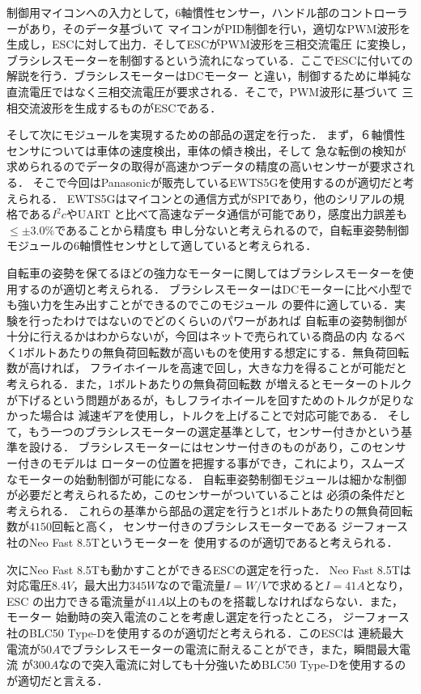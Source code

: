 \documentclass[uplatex,dvipdfmx]{jsarticle}
\begin{document}
制御用マイコンへの入力として，6軸慣性センサー，ハンドル部のコントローラーがあり，そのデータ基づいて
マイコンがPID制御を行い，適切なPWM波形を生成し，ESCに対して出力．そしてESCがPWM波形を三相交流電圧
に変換し，ブラシレスモーターを制御するという流れになっている．ここでESCに付いての解説を行う．ブラシレスモーターはDCモーター
と違い，制御するために単純な直流電圧ではなく三相交流電圧が要求される．そこで，PWM波形に基づいて
三相交流波形を生成するものがESCである．

そして次にモジュールを実現するための部品の選定を行った．
まず，６軸慣性センサについては車体の速度検出，車体の傾き検出，そして
急な転倒の検知が求められるのでデータの取得が高速かつデータの精度の高いセンサーが要求される．
そこで今回はPanasonicが販売しているEWTS5Gを使用するのが適切だと考えられる\cite{rokujiku}．
EWTS5Gはマイコンとの通信方式がSPIであり，他のシリアルの規格である$I^2c$やUART
と比べて高速なデータ通信が可能であり，感度出力誤差も$\leq \pm 3.0\%$であることから精度も
申し分ないと考えられるので，自転車姿勢制御モジュールの6軸慣性センサとして適していると考えられる．

自転車の姿勢を保てるほどの強力なモーターに関してはブラシレスモーターを使用するのが適切と考えられる．
ブラシレスモーターはDCモーターに比べ小型でも強い力を生み出すことができるのでこのモジュール
の要件に適している．実験を行ったわけではないのでどのくらいのパワーがあれば
自転車の姿勢制御が十分に行えるかはわからないが，今回はネットで売られている商品の内
なるべく1ボルトあたりの無負荷回転数が高いものを使用する想定にする．無負荷回転数が高ければ，
フライホイールを高速で回し，大きな力を得ることが可能だと考えられる．また，1ボルトあたりの無負荷回転数
が増えるとモーターのトルクが下げるという問題があるが，もしフライホイールを回すためのトルクが足りなかった場合は
減速ギアを使用し，トルクを上げることで対応可能である．
そして，もう一つのブラシレスモーターの選定基準として，センサー付きかという基準を設ける．
ブラシレスモーターにはセンサー付きのものがあり，このセンサー付きのモデルは
ローターの位置を把握する事ができ，これにより，スムーズなモーターの始動制御が可能になる．
自転車姿勢制御モジュールは細かな制御が必要だと考えられるため，このセンサーがついていることは
必須の条件だと考えられる．
これらの基準から部品の選定を行うと1ボルトあたりの無負荷回転数が$4150$回転と高く，
センサー付きのブラシレスモーターである
ジーフォース社のNeo Fast 8.5Tというモーターを
使用するのが適切であると考えられる\cite{burasiresu}．

次にNeo Fast 8.5Tも動かすことができるESCの選定を行った．
Neo Fast 8.5Tは
対応電圧$8.4V$，最大出力$345W$なので電流量$I=W/V$で求めると$I=41A$となり，ESC
の出力できる電流量が$41A$以上のものを搭載しなければならない．また，モーター
始動時の突入電流のことを考慮し選定を行ったところ，
ジーフォース社のBLC50 Type-Dを使用するのが適切だと考えられる．このESCは
連続最大電流が$50A$でブラシレスモーターの電流に耐えることができ，また，瞬間最大電流
が$300A$なので突入電流に対しても十分強いためBLC50 Type-Dを使用するのが適切だと言える\cite{esc}．
\end{document}
